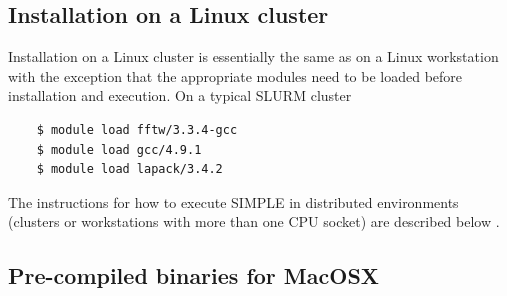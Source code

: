 \documentclass[a4paper,11pt]{article}
\begin{document}
\subsection{Installation on a Linux cluster}
\label{inst_clusters_linux}

Installation on a Linux cluster is essentially the same as on a Linux workstation with the exception that the appropriate modules need to be loaded before installation and execution. On a typical SLURM cluster

\begin{verbatim}
    $ module load fftw/3.3.4-gcc
    $ module load gcc/4.9.1
    $ module load lapack/3.4.2 
\end{verbatim}

The instructions for how to execute SIMPLE in distributed environments (clusters or workstations with more than one CPU socket) are described below \label{distr}.

\subsection{Pre-compiled binaries for MacOSX}
\label{inst_auto_binaries_macosx}
\end{document}
